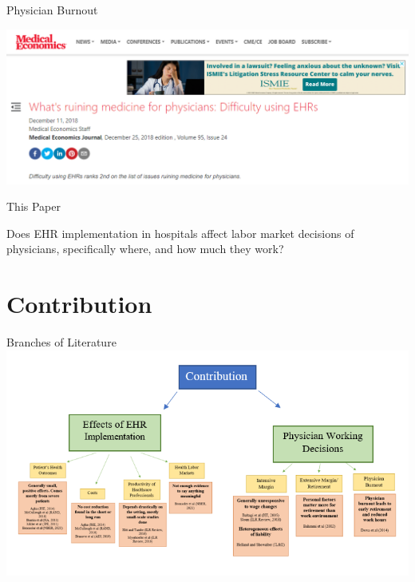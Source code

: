 \documentclass[10pt]{beamer}
\begin{document}
\begin{frame}[noframenumbering]{Physician Burnout}
\begin{center}
    \includegraphics[scale=.3]{graphics/News Clip3.PNG}
\end{center}
\end{frame}

\begin{frame}{This Paper}

Does EHR implementation in hospitals affect labor market decisions of physicians, specifically where, and how much they work?
    
\end{frame}


\section{Contribution}

\begin{frame}{Branches of Literature}
\centering
\includegraphics[scale=.45]{graphics/Contribution_litgraphic.PNG}

\end{frame}
\end{document}
